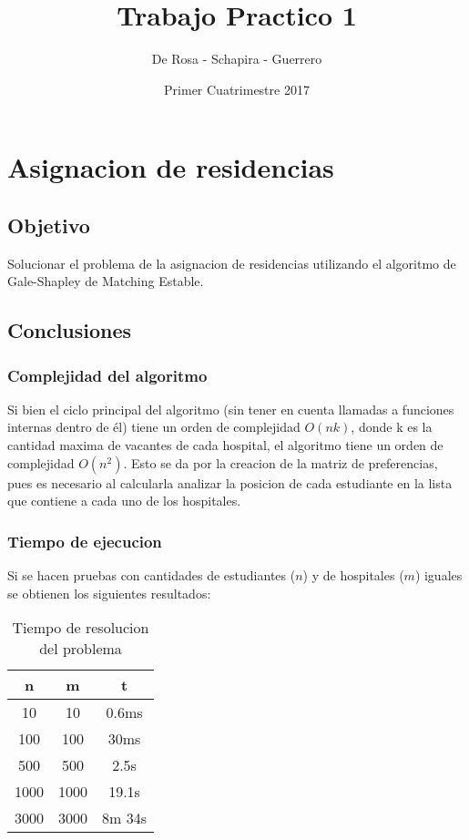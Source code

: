 \documentclass{article}
\title{Trabajo Practico 1}
\author{De Rosa - Schapira - Guerrero}
\date{Primer Cuatrimestre 2017}
\begin{document}
    \maketitle
    \newpage
    \tableofcontents
    \newpage

    \section{Asignacion de residencias}
        \subsection{Objetivo}
            Solucionar el problema de la asignacion de residencias utilizando
            el algoritmo de Gale-Shapley de Matching Estable.
        \subsection{Conclusiones}
            \subsubsection{Complejidad del algoritmo}
                Si bien el ciclo principal del algoritmo (sin tener en cuenta 
                llamadas a funciones internas dentro de él) tiene un orden de complejidad 
                $O(nk)$, donde k es la cantidad maxima de vacantes de cada hospital, 
                el algoritmo tiene un orden de complejidad $O(n^2)$. Esto se da por la 
                creacion de la matriz de preferencias, pues es necesario al calcularla analizar 
                la posicion de cada estudiante en la lista que contiene a cada uno de los hospitales.
            \subsubsection{Tiempo de ejecucion}
                Si se hacen pruebas con cantidades de estudiantes ($n$) y de hospitales
                ($m$) iguales se obtienen los siguientes resultados:
                \begin{table}[h!]
                    \centering
                    \caption{Tiempo de resolucion del problema}
                    \begin{tabular}{c|c|c}
                        n & m & t \\
                        \hline
                        10 & 10 & 0.6ms \\
                        \hline
                        100 & 100 & 30ms \\
                        \hline
                        500 & 500 & 2.5s \\
                        \hline
                        1000 & 1000 & 19.1s \\
                        \hline
                        3000 & 3000 & 8m 34s
                    \end{tabular}
                \end{table}
\end{document}
